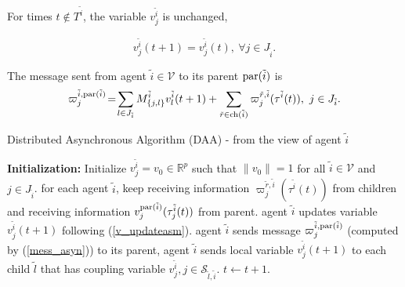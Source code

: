 \documentclass[journal]{IEEEtran}
\begin{document}
For times $t \notin T^{\tilde{i}}$, the variable $v_j^{\tilde{i}}$ is unchanged,

$$v_j^{\tilde{i}}(t+1)=v_j^{\tilde{i}}(t), \ \forall j\in J_{\tilde{i}}.
$$
\par The message sent from agent $\tilde{i}\in\mathcal{V}$ to its parent ${\rm par}(\tilde{i})$ is
\begin{align}\label{mess_asyn}
\varpi_j^{\tilde{i},{\rm par}(\tilde{i})} \!=\! \sum_{l\in J_{\tilde{i}}} M_{\{j,l\}}^{\tilde{i}} v_{l}^{\tilde{i}}(t+1)+\sum_{\tilde{r} \in {\rm ch}(\tilde{i})}\varpi_j^{\tilde{r},\tilde{i}}(\tau^{\tilde{i}}(t)),\ j\in J_{\tilde{i}}.
\end{align}	
\begin{algorithm}[H]
	\caption{Distributed Asynchronous Algorithm (DAA) - from the view of agent $\tilde{i}$}
	\label{algo_asyn}
	\begin{algorithmic}[1]  %
		\State \textbf{Initialization:} Initialize  $v_j^{\tilde{i}}=v_0\in\mathbb R^p$ such that $\|v_0\|=1$ for all  $\tilde{i}\in\mathcal V$ and $j\in J_{\tilde{i}}$.
		\State for each agent $\tilde{i}$, keep receiving information $\varpi_j^{\tilde{r},\tilde{i}}(\tau^{\tilde{i}}(t))$ from children and receiving information  $v_j^{{\rm par}(\tilde{i})}(\tau_{j}^{\tilde{i}}(t))$ from parent.
		\State agent $\tilde{i}$ updates variable $v_j^{\tilde{i}}(t+1)$ following (\ref{v_updateasm}).
		\State agent $\tilde{i}$ sends message $\varpi_j^{\tilde{i},{\rm par}(\tilde{i})}$ (computed by (\ref{mess_asyn})) to its parent,
		\EndIf
		\State agent $\tilde{i}$ sends local variable $v_j^{\tilde{i}}(t+1)$ to each child $\tilde{l}$ that has coupling variable $v_j^{\tilde{i}},j\in \mathcal{S}_{\tilde{l},\tilde{i}}$.
		\EndIf
		\EndFor
		\EndIf
		\State $t\leftarrow t+1$.
		\EndWhile
	\end{algorithmic}
\end{algorithm}


\end{document}
